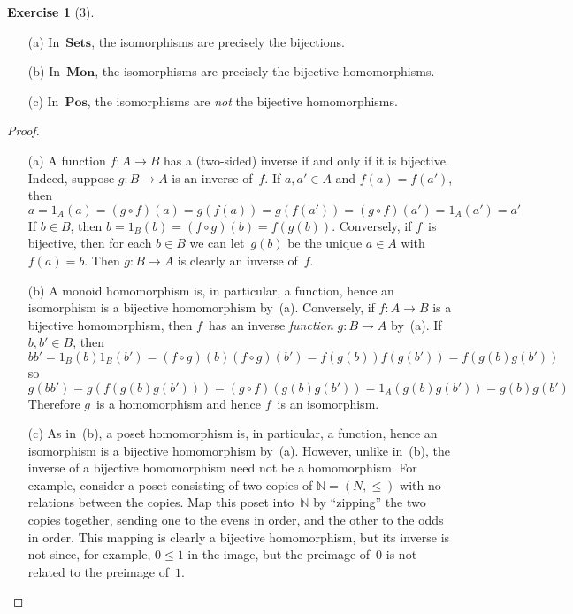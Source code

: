 \documentclass[letterpaper,12pt]{article}
\newcommand{\N}{\mathbb{N}}
\newcommand{\after}{\circ}
\newcommand{\cat}[1]{\mathbf{#1}}
\newcommand{\Sets}{\cat{Sets}}
\newcommand{\Mon}{\cat{Mon}}
\newcommand{\Pos}{\cat{Pos}}
\theoremstyle{definition}
\newtheorem*{exer}{Exercise}
\theoremstyle{remark}
\theoremstyle{direction}
\begin{document}
\begin{exer}[3]\
\begin{enumerate}[itemsep=0pt]
\item[(a)] In~\(\Sets\), the isomorphisms are precisely the bijections.
\item[(b)] In~\(\Mon\), the isomorphisms are precisely the bijective homomorphisms.
\item[(c)] In~\(\Pos\), the isomorphisms are \emph{not} the bijective homomorphisms.
\end{enumerate}
\begin{proof}\
\begin{enumerate}
\item[(a)] A function \(f:A\to B\) has a (two-sided) inverse if and only if it is bijective. Indeed, suppose \(g:B\to A\) is an inverse of~\(f\). If \(a,a'\in A\) and \(f(a)=f(a')\), then
\[a=1_A(a)=(g\after f)(a)=g(f(a))=g(f(a'))=(g\after f)(a')=1_A(a')=a'\]
If \(b\in B\), then \(b=1_B(b)=(f\after g)(b)=f(g(b))\). Conversely, if \(f\)~is bijective, then for each \(b\in B\) we can let~\(g(b)\) be the unique \(a\in A\) with \(f(a)=b\). Then \(g:B\to A\) is clearly an inverse of~\(f\).
\item[(b)] A monoid homomorphism is, in particular, a function, hence an isomorphism is a bijective homomorphism by~(a). Conversely, if \(f:A\to B\) is a bijective homomorphism, then \(f\)~has an inverse \emph{function} \(g:B\to A\) by~(a). If \(b,b'\in B\), then
\[bb'=1_B(b)1_B(b')=(f\after g)(b)(f\after g)(b')=f(g(b))f(g(b'))=f(g(b)g(b'))\]
so
\[g(bb')=g(f(g(b)g(b')))=(g\after f)(g(b)g(b'))=1_A(g(b)g(b'))=g(b)g(b')\]
Therefore \(g\)~is a homomorphism and hence \(f\)~is an isomorphism.
\item[(c)] As in~(b), a poset homomorphism is, in particular, a function, hence an isomorphism is a bijective homomorphism by~(a). However, unlike in~(b), the inverse of a bijective homomorphism need not be a homomorphism. For example, consider a poset consisting of two copies of \(\N=(N,\le)\) with no relations between the copies. Map this poset into~\(\N\) by ``zipping'' the two copies together, sending one to the evens in order, and the other to the odds in order. This mapping is clearly a bijective homomorphism, but its inverse is not since, for example, \(0\le 1\) in the image, but the preimage of~\(0\) is not related to the preimage of~\(1\).\qedhere
\end{enumerate}
\end{proof}
\end{exer}
\end{document}

